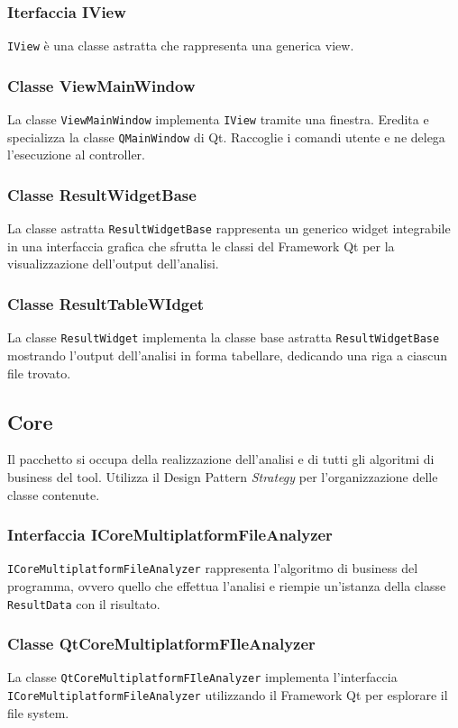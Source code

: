 \subsubsection{Iterfaccia IView}
\texttt{IView} è una classe astratta che rappresenta una generica view.

\subsubsection{Classe ViewMainWindow}
La classe \texttt{ViewMainWindow} implementa \texttt{IView} tramite una finestra. Eredita e specializza la classe \texttt{QMainWindow} di Qt. Raccoglie i comandi utente e ne delega l'esecuzione al controller.

\subsubsection{Classe ResultWidgetBase}
La classe astratta \texttt{ResultWidgetBase} rappresenta un generico widget integrabile in una interfaccia grafica che sfrutta le classi del Framework Qt per la visualizzazione dell'output dell'analisi.

\subsubsection{Classe ResultTableWIdget}
La classe \texttt{ResultWidget} implementa la classe base astratta \texttt{ResultWidgetBase} mostrando l'output dell'analisi in forma tabellare, dedicando una riga a ciascun file trovato.

\subsection{Core}
Il pacchetto si occupa della realizzazione dell'analisi e di tutti gli algoritmi di business del tool. Utilizza il Design Pattern \textit{Strategy} per l'organizzazione delle classe contenute.

\subsubsection{Interfaccia ICoreMultiplatformFileAnalyzer}
\texttt{ICoreMultiplatformFileAnalyzer} rappresenta l'algoritmo di business del programma, ovvero quello che effettua l'analisi e riempie un'istanza della classe \texttt{ResultData} con il risultato.

\subsubsection{Classe QtCoreMultiplatformFIleAnalyzer}
La classe \texttt{QtCoreMultiplatformFIleAnalyzer} implementa l'interfaccia\\ \texttt{ICoreMultiplatformFileAnalyzer} utilizzando il Framework Qt per esplorare il file system.

